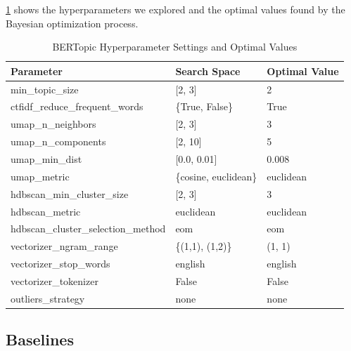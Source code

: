\cref{tab:bertopic_parameters} shows the hyperparameters we explored and the optimal values found by the Bayesian optimization process.

\begin{table}[h]
    \centering
    \begin{tabular}{lll}
    \toprule
    Parameter & Search Space & Optimal Value \\
    \midrule
    min\_topic\_size & [2, 3] & 2 \\
    ctfidf\_reduce\_frequent\_words & \{True, False\} & True \\
    umap\_n\_neighbors & [2, 3] & 3 \\
    umap\_n\_components & [2, 10] & 5 \\
    umap\_min\_dist & [0.0, 0.01] & 0.008 \\
    umap\_metric & \{cosine, euclidean\} & euclidean \\
    hdbscan\_min\_cluster\_size & [2, 3] & 3 \\
    hdbscan\_metric & euclidean & euclidean \\
    hdbscan\_cluster\_selection\_method & eom & eom \\
    vectorizer\_ngram\_range & \{(1,1), (1,2)\} & (1, 1) \\
    vectorizer\_stop\_words & english & english \\
    vectorizer\_tokenizer & False & False \\
    outliers\_strategy & none & none \\
    \bottomrule
    \end{tabular}
    \caption{BERTopic Hyperparameter Settings and Optimal Values}
    \label{tab:bertopic_parameters}
\end{table}

\subsection{Baselines}
